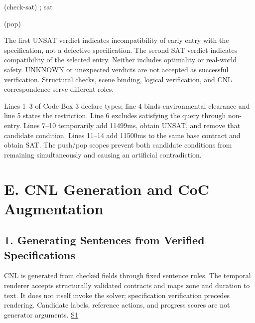 \documentclass[11pt,a4paper]{article}
\begin{document}
\begin{minipage}{\linewidth}
{\begin{minipage}{\dimexpr\linewidth-2\fboxsep-2\fboxrule\relax}
\noindent{}\hspace{.8em}\parbox[t]{\dimexpr\linewidth-2.8em\relax}{\raggedright\ttfamily\fontsize{8.2}{10.5}\selectfont \hspace*{0.0em}(check-sat) ; sat\strut}\par\vspace{1pt}
\noindent{}\hspace{.8em}\parbox[t]{\dimexpr\linewidth-2.8em\relax}{\raggedright\ttfamily\fontsize{8.2}{10.5}\selectfont \hspace*{0.0em}(pop)\strut}\par\vspace{1pt}
\end{minipage}}\par\medskip
\end{minipage}\par\medskip

The first UNSAT verdict indicates incompatibility of early entry with the specification, not a defective specification. The second SAT verdict indicates compatibility of the selected entry. Neither includes optimality or real-world safety. UNKNOWN or unexpected verdicts are not accepted as successful verification. Structural checks, scene binding, logical verification, and CNL correspondence serve different roles.\par

Lines 1–3 of Code Box 3 declare types; line 4 binds environmental clearance and line 5 states the restriction. Line 6 excludes satisfying the query through non-entry. Lines 7–10 temporarily add 11499ms, obtain UNSAT, and remove that candidate condition. Lines 11–14 add 11500ms to the same base contract and obtain SAT. The push/pop scopes prevent both candidate conditions from remaining simultaneously and causing an artificial contradiction.\par

\section*{E. CNL Generation and CoC Augmentation}

\subsection*{1. Generating Sentences from Verified Specifications}

CNL is generated from checked fields through fixed sentence rules. The temporal renderer accepts structurally validated contracts and maps zone and duration to text. It does not itself invoke the solver; specification verification precedes rendering. Candidate labels, reference actions, and progress scores are not generator arguments. \href{\detokenize{../../../../../../projects/04-guardsynth-coc/experiments/paper1_cnl_learning/temporal_preservation.py}}{S1}\par
\end{document}
